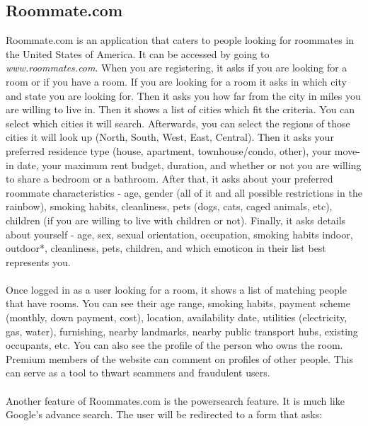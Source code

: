 \documentclass[journal]{./IEEE/IEEEtran}
\begin{document}
\subsection{Roommate.com}
Roommate.com is an application that caters to people looking for roommates in the United States of America. It can be accessed by going to \textit{www.roommates.com}. When you are registering, it asks if you are looking for a room or if you have a room. If you are looking for a room it asks in which city and state you are looking for. Then it asks you how far from the city in miles you are willing to live in. Then it shows a list of cities which fit the criteria. You can select which cities it will search. Afterwards, you can select the regions of those cities it will look up (North, South, West, East, Central). Then it asks your preferred residence type (house, apartment, townhouse/condo, other), your move-in date, your maximum rent budget, duration, and whether or not you are willing to share a bedroom or a bathroom. After that, it asks about your preferred roommate characteristics - age, gender (all of it and all possible restrictions in the rainbow), smoking habits, cleanliness, pets (dogs, cats, caged animals, etc), children (if you are willing to live with children or not). Finally, it asks details about yourself -  age, sex, sexual orientation, occupation, smoking habits {indoor, outdoor}*, cleanliness, pets, children, and which emoticon in their list best represents you.
\\
\\
\indent Once logged in as a user looking for a room, it shows a list of matching people that have rooms. You can see their age range, smoking habits, payment scheme (monthly, down payment, cost), location, availability date, utilities (electricity, gas, water), furnishing, nearby landmarks, nearby public transport hubs, existing occupants, etc. You can also see the profile of the person who owns the room. Premium members of the website can comment on profiles of other people. This can serve as a tool to thwart scammers and fraudulent users.
\\
\\
\indent Another feature of Roommates.com is the powersearch feature. It is much like Google's advance search. The user will be redirected to a form that asks:
\end{document}
